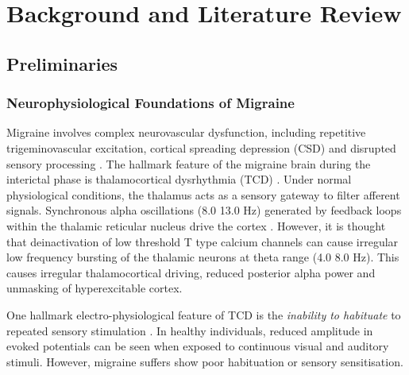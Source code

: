\documentclass[12pt, a4paper]{report}
\begin{document}
\chapter{Background and Literature Review}
\label{ch:background}

\section{Preliminaries}
\subsection{Neurophysiological Foundations of Migraine}
\label{sec:neuro_foundations}
 Migraine involves complex neurovascular dysfunction, including repetitive trigeminovascular excitation, cortical spreading depression (CSD) and disrupted sensory processing \cite{Zhang2023,VanDenHoek2024}. The hallmark feature of the migraine brain during the interictal phase is thalamocortical dysrhythmia (TCD) \cite{VanDenHoek2024,AbdulhusseinAldeen2024}. Under normal physiological conditions, the thalamus acts as a sensory gateway to filter afferent signals. Synchronous alpha oscillations (8.0 13.0 Hz) generated by feedback loops within the thalamic reticular nucleus drive the cortex \cite{Zhang2023}. However, it is thought that deinactivation of low threshold T type calcium channels can cause irregular low frequency bursting of the thalamic neurons at theta range (4.0 8.0 Hz). This causes irregular thalamocortical driving, reduced posterior alpha power and unmasking of hyperexcitable cortex. 


One hallmark electro-physiological feature of TCD is the \textit{ inability to habituate} to repeated sensory stimulation \cite{chamanzar2021uhd,AbdulhusseinAldeen2024} . In healthy individuals, reduced amplitude in evoked potentials can be seen when exposed to continuous visual and auditory stimuli. However, migraine suffers show poor habituation or sensory sensitisation.
\end{document}

